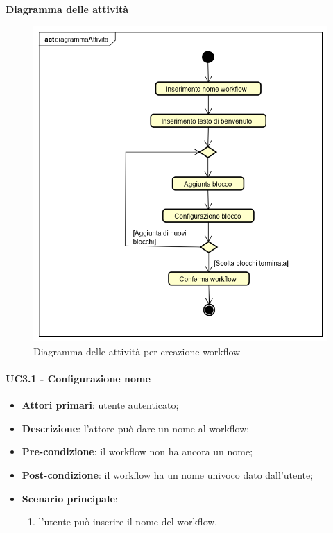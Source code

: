 \pagebreak
\item \textbf{Diagramma delle attività}
\begin{figure}[H]
\centering
\includegraphics[scale=0.7]{immagini/diagrammaAttivita}
\caption{Diagramma delle attività per creazione workflow \label{fig:diagrammaAttivita}}
\end{figure}

\paragraph{UC3.1 - Configurazione nome}

\begin{itemize}
\item \textbf{Attori primari}:  utente autenticato;

\item \textbf{Descrizione}: l'attore può dare un nome al workflow;

\item \textbf{Pre-condizione}: il workflow non ha ancora un nome;

\item \textbf{Post-condizione}: il workflow ha un nome univoco dato dall'utente;

\item \textbf{Scenario principale}:
\begin{enumerate}
\item l'utente può inserire il nome del workflow.

\end{enumerate}
\end{itemize}

